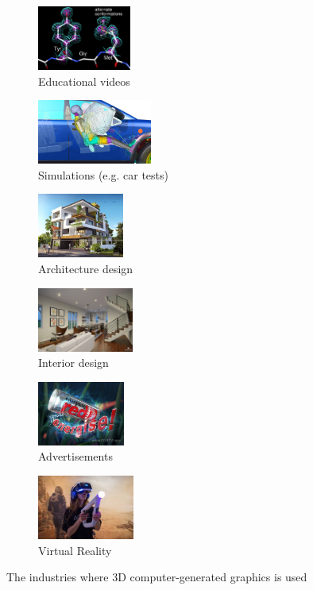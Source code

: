 \documentclass[11pt,a4paper]{article}
\begin{document}
\begin{figure}[H]
 \begin{subfigure}{0.31\textwidth}
 \centering
 \includegraphics[height=80px]{images/molecular}
 \caption{Educational videos}
 \end{subfigure}
  \begin{subfigure}{0.31\textwidth}
  \centering
 \includegraphics[height=80px,trim=100 0 100 0,clip]{images/car_crash}
 \caption{Simulations (e.g. car tests)}
 \end{subfigure}
   \begin{subfigure}{0.31\textwidth}
   \centering
 \includegraphics[height=80px]{images/building_design.jpg}
 \caption{Architecture design}
 \end{subfigure}
  \vspace{1em}
 
  \begin{subfigure}{0.31\textwidth}
  \centering
 \includegraphics[height=80px]{images/interior_design.jpg}
 \caption{Interior design}
 \end{subfigure}
  \begin{subfigure}{0.31\textwidth}
  \centering
 \includegraphics[height=80px]{images/advertisement.jpg}
 \caption{Advertisements}
 \end{subfigure}
   \begin{subfigure}{0.31\textwidth}
   \centering
 \includegraphics[height=80px]{images/virtual_reality.jpg}
 \caption{Virtual Reality}
 \end{subfigure}
 \caption{The industries where 3D computer-generated graphics is used}
 \label{fig:ind}
\end{figure}
\end{document}
